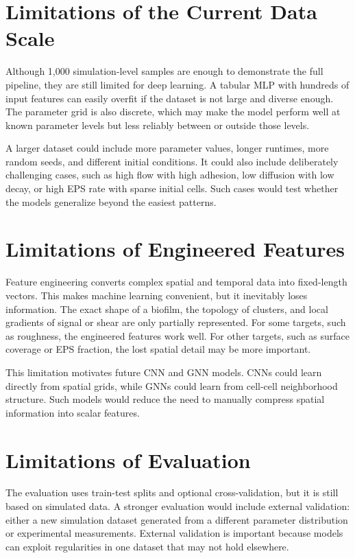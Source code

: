 \documentclass[12pt,a4paper,oneside]{report}
\begin{document}
\section{Limitations of the Current Data Scale}
Although 1,000 simulation-level samples are enough to demonstrate the full pipeline, they are still limited for deep learning. A tabular MLP with hundreds of input features can easily overfit if the dataset is not large and diverse enough. The parameter grid is also discrete, which may make the model perform well at known parameter levels but less reliably between or outside those levels.

A larger dataset could include more parameter values, longer runtimes, more random seeds, and different initial conditions. It could also include deliberately challenging cases, such as high flow with high adhesion, low diffusion with low decay, or high EPS rate with sparse initial cells. Such cases would test whether the models generalize beyond the easiest patterns.

\section{Limitations of Engineered Features}
Feature engineering converts complex spatial and temporal data into fixed-length vectors. This makes machine learning convenient, but it inevitably loses information. The exact shape of a biofilm, the topology of clusters, and local gradients of signal or shear are only partially represented. For some targets, such as roughness, the engineered features work well. For other targets, such as surface coverage or EPS fraction, the lost spatial detail may be more important.

This limitation motivates future CNN and GNN models. CNNs could learn directly from spatial grids, while GNNs could learn from cell-cell neighborhood structure. Such models would reduce the need to manually compress spatial information into scalar features.

\section{Limitations of Evaluation}
The evaluation uses train-test splits and optional cross-validation, but it is still based on simulated data. A stronger evaluation would include external validation: either a new simulation dataset generated from a different parameter distribution or experimental measurements. External validation is important because models can exploit regularities in one dataset that may not hold elsewhere.
\end{document}
